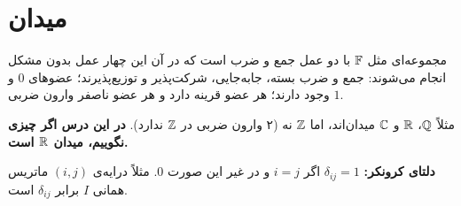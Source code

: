 \section{میدان}\label{sec:field}
\begin{definition}[میدان]
 مجموعه‌ای مثل $\mathbb{F}$ با دو عمل جمع و ضرب است که در آن این چهار عمل بدون مشکل انجام می‌شوند: جمع و ضرب بسته، جابه‌جایی، شرکت‌پذیر و توزیع‌پذیرند؛ عضوهای $0$ و $1$ وجود دارند؛ هر عضو قرینه دارد و هر عضو ناصفر وارون  ضربی.
\end{definition}

مثلاً $\mathbb{Q}$، $\mathbb{R}$ و $\mathbb{C}$ میدان‌اند، اما $\mathbb{Z}$ نه (۲ وارون ضربی در $\mathbb{Z}$ ندارد). \textbf{در این درس اگر چیزی نگوییم، میدان $\mathbb{R}$ است.}

\textbf{دلتای کرونکر:} $\delta_{ij}=1$ اگر $i=j$ و در غیر این صورت $0$. مثلاً درایه‌ی $(i,j)$ ماتریس همانی $I$ برابر $\delta_{ij}$ است.
